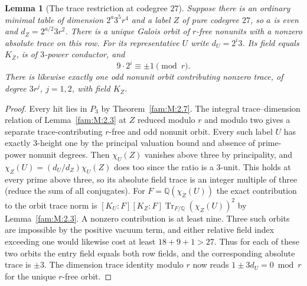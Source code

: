 \documentclass[11pt,a4paper]{article}
\numberwithin{equation}{section}
\newtheorem{lemma}[theorem]{Lemma}
\theoremstyle{remark}
\newcommand{\QQ}{\mathbb Q}
\begin{document}
\begin{lemma}[The trace restriction at codegree $27$]\label{fam:Q:6.5}\label{fam:Q:n:quart:twentyseven}
Suppose there is an ordinary minimal table of dimension $2^a3^5r^4$ and a label $Z$ of pure
codegree $27$, so $a$ is even and $d_Z=2^{a/2}3r^2$.
There is a unique Galois orbit of $r$-free nonunits with a
nonzero absolute trace on this row. For its representative $U$
write $d_U=2^i3$. Its field equals $K_Z$, is of $3$-power
conductor, and
\[
                     9\cdot2^i\equiv\pm1\pmod r .
\]
There is likewise exactly one odd nonunit orbit contributing
nonzero trace, of degree $3r^j$, $j=1,2$, with field $K_Z$.
\end{lemma}
\begin{proof}
Every hit lies in $P_3$ by Theorem~\ref{fam:M:2.7}.
The integral trace--dimension relation of Lemma~\ref{fam:M:2.3} at $Z$ reduced modulo $r$
and modulo two gives a separate trace-contributing $r$-free and
odd nonunit orbit. Every such label $U$ has exactly $3$-height one
by the principal valuation bound and absence of prime-power
nonunit degrees. Then $\chi_U(Z)$ vanishes above three by
principality, and $\chi_Z(U)=(d_U/d_Z)\chi_U(Z)$ does too since
the ratio is a $3$-unit. This holds at every prime above three, so
its absolute field trace is an integer multiple of three (reduce
the sum of all conjugates). For $F=\QQ(\chi_Z(U))$ the exact contribution to the
orbit trace norm is $[K_U:F][K_Z:F]\operatorname{Tr}_{F/\QQ}(\chi_Z(U))^2$
by Lemma~\ref{fam:M:2.3}. A nonzero contribution is at least nine. Three such orbits are impossible
by the positive vacuum term, and either relative field index
exceeding one would likewise cost at least $18+9+1>27$. Thus for
each of these two orbits the entry field equals both row fields,
and the corresponding absolute trace is $\pm3$. The dimension
trace identity modulo $r$ now reads $1\pm3d_U=0\bmod r$ for
the unique $r$-free orbit.
\end{proof}
\end{document}
